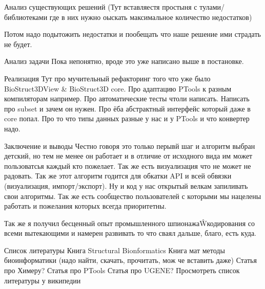 \documentclass[a4paper, 14pt, titlepage, utf8]{extarticle}
\begin{document}
Анализ существующих решений
(Тут вставляестя простыня с тулами/библиотеками где в них нужно оыскать максимальное количество недостатков)

Потом надо подытожить недостатки и пообещать что наше решение ими страдать не будет.

Анализ задачи
Пока непонятно, вроде это уже написано выше в постановке.

Реализация
Тут про мучительный рефакторинг того что уже было BioStruct3DView \& BioStruct3D core.
Про адаптацию PTools к разным компиляторам например.
Про автоматические тесты чтоли написать.
Написать про subset и зачем он нужен. 
Про ёба абстрактный интерфейс который даже в core попал.
Про то что типы данных разные у нас и у PTools и что конвертер надо.

Заключение и выводы
Честно говоря это только перывй шаг и алгоритм выбран детский, но тем не менее он работает и в отличие от исходного вида им может пользоватсья каждый кто пожелает. Так же есть визуализация что не может не радовать. Так же этот алгоритм годится для обкатки API и всей обвязки (визуализация, импорт/экспорт). Ну и код у нас открытый велкам запиливать свои алгоритмы. Так же есть сообщество пользователей с которыми мы нацелены работать и пожелания которых всегда приоритетны. 

Так же я получил бесценный опыт промышленного шпионажа\^Wкодирования со всеми вытекающими и намерен развивать то что сваял дальше, благо, есть куда.

Список литературы
Книга Structural Bionformatics
Книга мат методы биоинформатики (надо найти, скачать, прочитать, мож че вставить даже)
Статья про Химеру?
Статья про PTools
Статья про UGENE?
Просмотреть список литературы у википедии
\end{document}
